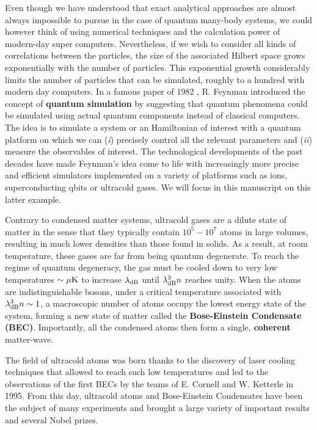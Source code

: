 Even though we have understood that exact analytical approaches are almost always impossible to pursue in the case of quantum many-body systems, we could however think of using numerical techniques and the calculation power of modern-day super computers. Nevertheless, if we wish to consider all kinds of correlations between the particles, the size of the associated Hilbert space grows exponentially with the number of particles. This exponential growth considerably limits the number of particles that can be simulated, roughly to a hundred with modern day computers. In a famous paper of 1982 \cite{Feynman1982Simulating}, R. Feynman introduced the concept of \textbf{quantum simulation} by suggesting that quantum phenomena could be simulated using actual quantum components instead of classical computers. The idea is to simulate a system or an Hamiltonian of interest with a quantum platform on which we can (\textit{i}) precisely control all the relevant parameters and (\textit{ii}) measure the observables of interest. The technological developments of the past decades have made Feynman's idea come to life with increasingly more precise and efficient simulators implemented on a variety of platforms such as ions, superconducting qbits or ultracold gases. We will focus in this manuscript on this latter example.  

Contrary to condensed matter systems, ultracold gases are a dilute state of matter in the sense that they typically contain $10^5-10^7$ atoms in large volumes, resulting in much lower densities than those found in solids. As a result, at room temperature, these gases are far from being quantum degenerate. To reach the regime of quantum degeneracy, the gas must be cooled down to very low temperatures $\sim \mu \rm{K}$ to increase $\lambda_{\rm{dB}}$ until $\lambda_{\rm{dB}}^3 n$ reaches unity. When the atoms are indistinguishable  bosons, under a critical temperature associated with $\lambda_{\rm{dB}}^3 n \sim 1$, a macroscopic number of atoms occupy the lowest energy state of the system, forming a new state of matter called the \textbf{Bose-Einstein Condensate (BEC)}. Importantly, all the condensed atoms then form a single, \textbf{coherent} matter-wave. 

The field of ultracold atoms was born thanks to the discovery of laser cooling techniques \cite{chu1985three,dalibard1989laser,phillips1982laser} that allowed to reach such low temperatures and led to the observations of the first BECs by the teams of E. Cornell \cite{anderson1995observation} and W. Ketterle \cite{davis1995bose} in 1995. From this day, ultracold atoms and Bose-Einstein Condensates have been the subject of many experiments and brought a large variety of important results and several Nobel prizes.

